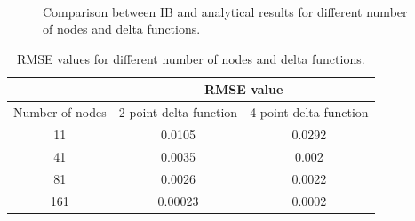 \begin{figure}[H]
{    }
    \quad
    \\
    \quad
    \caption{Comparison between IB and analytical results for different number of nodes and delta functions.}
    \label{fig:C3_classicalIBResultNodeNumber}
\end{figure}

\begin{table}[H]
\centering
\begin{tabular}{c | c | c}
      & \multicolumn{2}{c}{RMSE value} \\ \hline
     Number of nodes & 2-point delta function & 4-point delta function \\ \hline \hline
     11 & 0.0105 & 0.0292 \\ \hline
     41 & 0.0035 & 0.002 \\ \hline
     81 & 0.0026 & 0.0022 \\ \hline
     161 & 0.00023 & 0.0002 \\
\end{tabular}
\caption{RMSE values for different number of nodes and delta functions.}
\label{table:C3_classicalIBResultNodeNumberRMSE}
\end{table}

